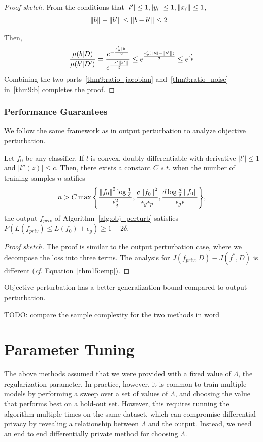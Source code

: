 \documentclass{article} %
\begin{document}
\begin{proof}[Proof sketch]
From the conditions that $\left\lvert l'\right\rvert \le 1, \left\lvert y_i\right\rvert \le 1, \left\lVert x_i\right\rVert \le 1$,
\begin{align*}
& \left\lVert b\right\rVert - \left\lVert b'\right\rVert \le \left\lVert b - b'\right\rVert \le 2
\end{align*}

Then, \begin{align}
 \frac{\mu(b | D)}{\mu(b' | D')} = \frac{e^{-\frac{\epsilon_p' \left\lVert b\right\rVert}{2}}}{e^{\frac{-\epsilon' \left\lVert b'\right\rVert}{2}}}\le e^{\frac{\epsilon_p'(\left\lVert b\right\rVert - \left\lVert b'\right\rVert)}{2}} \le e^{\epsilon'_p} \label{thm9:ratio_noise}
\end{align}
 Combining the two parts~\eqref{thm9:ratio_jacobian} and~\eqref{thm9:ratio_noise} in~\eqref{thm9:b} completes the proof.
\end{proof}

\subsubsection{Performance Guarantees}
We follow the same framework as in output perturbation to analyze objective perturbation.
\begin{theorem}
Let $f_0$ be any classifier. If $l$ is convex, doubly differentiable with derivative $|l'| \le 1$ and $|l''(z)| \le c$. Then, there exists a constant $C$ \emph{s.t.} when the number of training samples $n$ satifies
$$n > C\max{\left\{ \frac{\left\lVert f_0\right\rVert^2 \log{\frac{1}{\delta}}}{\epsilon_g^2}, \frac{c\left\lVert f_0\right\rVert^2}{\epsilon_g \epsilon_p}, \frac{d\log{\frac{d}{\delta}} \left\lVert f_0\right\rVert}{\epsilon_g\epsilon}\right\}},$$
the output $f_{priv}$ of Algorithm~\ref{alg:obj_perturb} satisfies $P(L(f_{priv}) \le L(f_0) + \epsilon_g) \ge 1 - 2\delta$.
\end{theorem}
\begin{proof}[Proof sketch]
The proof is similar to the output perturbation case, where we decompose the loss into three terms. The analysis for $J(f_{priv}, D) - J(f^*, D)$ is different (\emph{cf.} Equation~\eqref{thm15:emp}).
\end{proof}

Objective perturbation has a better generalization bound compared to output perturbation.

TODO: compare the sample complexity for the two methods in word

\section{Parameter Tuning}
The above methods assumed that we were provided with a fixed value of $\Lambda$,
the regularization parameter. In practice, however, it is common to train
multiple models by performing a sweep over a set of values of $\Lambda$, and
choosing the value that performs best on a hold-out set. However, this requires
running the algorithm multiple times on the same dataset, which can compromise
differential privacy by revealing a relationship between $\Lambda$ and the
output. Instead, we need an end to end differentially private method for
choosing $\Lambda$.
\end{document}
